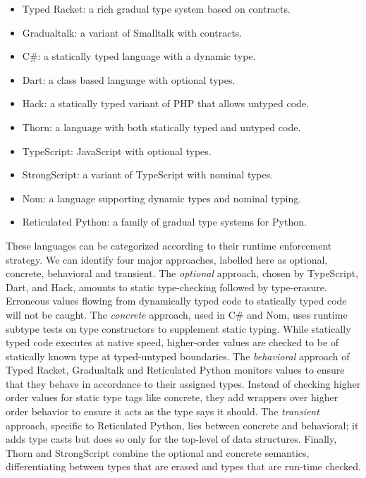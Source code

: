\documentclass[USenglish]{tex/lipics-v2016}
\begin{document}
\begin{itemize}
 \item Typed Racket: a rich gradual type system based on contracts.
 \item Gradualtalk: a variant of Smalltalk with contracts.
 \item C\#: a statically typed language with a dynamic type.
 \item Dart: a class based language with optional types.
 \item Hack: a statically typed variant of PHP that allows untyped code.
 \item Thorn: a language with both statically typed and untyped code.
 \item TypeScript: JavaScript with optional types.
 \item StrongScript: a variant of TypeScript with nominal types.
 \item Nom: a language supporting dynamic types and nominal typing.
 \item Reticulated Python: a family of gradual type systems for Python.
\end{itemize}

\noindent These languages can be categorized according to their runtime
enforcement strategy. We can identify four major approaches, labelled here
as optional, concrete, behavioral and transient. The \emph{optional}
approach, chosen by TypeScript, Dart, and Hack, amounts to static
type-checking followed by type-erasure.  Erroneous values flowing from
dynamically typed code to statically typed code will not be caught. The
\emph{concrete} approach, used in C\# and Nom, uses runtime subtype tests on
type constructors to supplement static typing.  While statically typed code
executes at native speed, higher-order values are checked to be of statically
known type at typed-untyped boundaries. The \emph{behavioral} approach of Typed Racket, Gradualtalk and
Reticulated Python monitors values to ensure that they behave in accordance
to their assigned types. Instead of checking higher order values for static
type tags like concrete, they add wrappers over higher order behavior to ensure
it acts as the type says it should. The \emph{transient} approach, specific to
Reticulated Python, lies between concrete and behavioral; it adds type casts
but does so only for the top-level of data structures. Finally, Thorn and
StrongScript combine the optional and concrete semantics,
differentiating between types that are erased and types that are run-time
checked.
\end{document}

